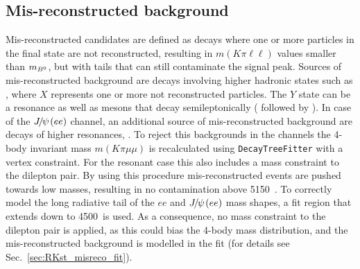 \subsection{Mis-reconstructed background}
\label{sec:RKst_peaking_Dchains}

Mis-reconstructed candidates are defined as decays where one or more particles in the final state are not reconstructed,
resulting in $m(K\pi\ell\ell)$ values smaller than $m_{{{B}^0}}$, but with tails that can still contaminate the signal peak.
Sources of mis-reconstructed background are decays involving higher hadronic states such as 
, where $X$ represents one or more not reconstructed particles. 
The $Y$ state can be a \Kstar resonance as well as \D mesons that decay semileptonically (\eg \decay{\Bz}{\Dm\ell^+ \bar{\nu_\ell}}
followed by \decay{\Dm}{\Kstarz \ell^- \nu_\ell}). In case of the $\jpsi(ee)$ channel, an additional source of mis-reconstructed 
background are decays of higher \ccbar resonances, .
%
To reject this backgrounds in the \mm channels the 4-body invariant mass $m(K\pi\mu\mu)$ is recalculated using 
\verb!DecayTreeFitter! with a vertex constraint. For the resonant case this also includes a \jpsi mass constraint to the dilepton pair. 
By using this procedure mis-reconstructed events are pushed towards low masses, resulting in no contamination above 5150~\mevcc.
%
To correctly model the long radiative tail of the $ee$ and $\jpsi(ee)$ mass shapes, a fit region that extends down to 4500~\mevcc is used.
As a consequence, no mass constraint to the dilepton pair is applied, as this could bias the 4-body mass distribution, and the
mis-reconstructed background is modelled in the fit (for details see Sec.~\ref{sec:RKst_misreco_fit}).


%

